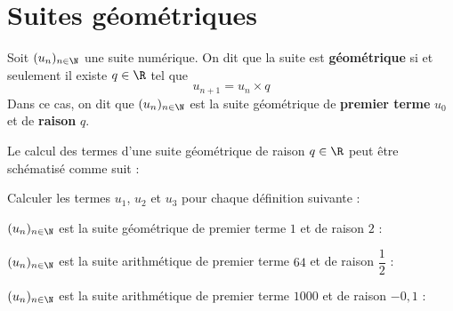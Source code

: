 \documentclass{article}
\begin{document}
\section{Suites géométriques}
\begin{tcolorbox}
\begin{definition}
Soit $(u_n)_{n \in \N}$ une suite numérique. On dit que la suite est \textbf{géométrique} si et seulement il existe $q \in \R$ tel que
\begin{equation*}
u_{n+1} = u_n \times q
\end{equation*}
Dans ce cas, on dit que $(u_n)_{n \in \N}$ est la suite géométrique de \textbf{premier terme} $u_0$ et de \textbf{raison} $q$.
\end{definition}
\end{tcolorbox}
\begin{remark}
Le calcul des termes d'une suite géométrique de raison $q \in \R$ peut être schématisé comme suit :
\begin{center}
\end{center}
\end{remark}
\begin{example}
Calculer les termes $u_1$, $u_2$ et $u_3$ pour chaque définition suivante :
\begin{enumquestions}
\item $(u_n)_{n \in \N}$ est la suite géométrique de premier terme $1$ et de raison $2$ : \answersline
\item $(u_n)_{n \in \N}$ est la suite arithmétique de premier terme $64$ et de raison $\dfrac{1}{2}$ : \answersline
\item $(u_n)_{n \in \N}$ est la suite arithmétique de premier terme $1000$ et de raison $-0,1$ : \answersline
\end{enumquestions}
\end{example}
\end{document}
